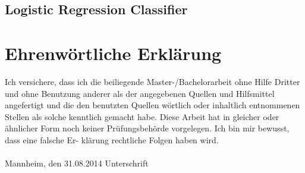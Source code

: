 \documentclass[a4paper, 11pt,titlepage,oneside,openany]{book}
\begin{document}
\subsection{Logistic Regression Classifier}
\newpage


\pagestyle{empty}


\section*{Ehrenw\"ortliche Erkl\"arung}
Ich versichere, dass ich die beiliegende Master-/Bachelorarbeit ohne Hilfe Dritter
und ohne Benutzung anderer als der angegebenen Quellen und Hilfsmittel
angefertigt und die den benutzten Quellen w\"ortlich oder inhaltlich
entnommenen Stellen als solche kenntlich gemacht habe. Diese Arbeit
hat in gleicher oder \"ahnlicher Form noch keiner Pr\"ufungsbeh\"orde
vorgelegen. Ich bin mir bewusst, dass eine falsche Er- kl\"arung rechtliche Folgen haben
wird.
\\
\\

\noindent
Mannheim, den 31.08.2014 \hspace{4cm} Unterschrift
\end{document}

